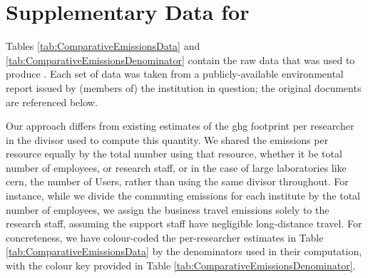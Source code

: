 \documentclass[../SustainableHEP.tex]{subfiles}
\begin{document}
\RaggedRight
\sloppy
\clearpage


\section{Supplementary Data for }
\label{sec:DataforFig1.4}

Tables \ref{tab:ComparativeEmissionsData} and \ref{tab:ComparativeEmissionsDenominator} contain the raw data that was used to produce .  Each set of data was taken from a publicly-available environmental report issued by (members of) the institution in question; the original documents are referenced below.

Our approach differs from existing estimates of the \acrshort{ghg} footprint per researcher in the divisor used to compute this quantity.  We shared the emissions per resource equally by the total number using that resource, whether it be total number of employees, or research staff, or in the case of large laboratories like \acrshort{cern}, the number of Users, rather than using the same divisor throughout.  For instance, while we divide the commuting emissions for each institute by the total number of employees, we assign the business travel emissions solely to the research staff, assuming the support staff have negligible long-distance travel.  For concreteness, we have colour-coded the per-researcher estimates in Table \ref{tab:ComparativeEmissionsData} by the denominators used in their computation, with the colour key provided in Table \ref{tab:ComparativeEmissionsDenominator}. 
\end{document}
